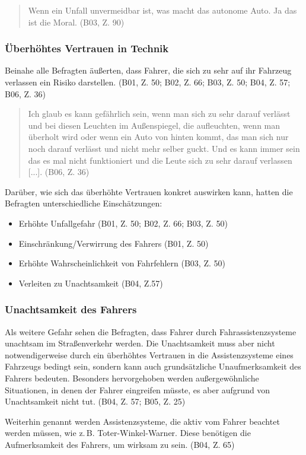 \documentclass[12pt]{article}
\begin{document}
\begin{quote}
  Wenn ein Unfall unvermeidbar ist, was macht das autonome Auto. Ja das ist die Moral. (B03, Z. 90)
\end{quote}

\subsubsection*{Überhöhtes Vertrauen in Technik}
Beinahe alle Befragten äußerten, dass Fahrer, die sich zu sehr auf ihr Fahrzeug verlassen ein Risiko darstellen. (B01, Z. 50; B02, Z. 66; B03, Z. 50; B04, Z. 57; B06, Z. 36)

\begin{quote}
  Ich glaub es kann gefährlich sein, wenn man sich zu sehr darauf verlässt und bei diesen Leuchten im Außenspiegel, die aufleuchten, wenn man überholt wird oder wenn ein Auto von hinten kommt, das man sich nur noch darauf verlässt und nicht mehr selber guckt. Und es kann immer sein das es mal nicht funktioniert und die Leute sich zu sehr darauf verlassen [...]. (B06, Z. 36)
\end{quote}

Darüber, wie sich das überhöhte Vertrauen konkret auswirken kann, hatten die Befragten unterschiedliche Einschätzungen:
\begin{itemize}
  \item Erhöhte Unfallgefahr (B01, Z. 50; B02, Z. 66; B03, Z. 50)
  \item Einschränkung/Verwirrung des Fahrers (B01, Z. 50)
  \item Erhöhte Wahrscheinlichkeit von Fahrfehlern (B03, Z. 50)
  \item Verleiten zu Unachtsamkeit (B04, Z.57)
\end{itemize}

\subsubsection*{Unachtsamkeit des Fahrers}
Als weitere Gefahr sehen die Befragten, dass Fahrer durch Fahrassistenzsysteme unachtsam im Straßenverkehr werden. Die Unachtsamkeit muss aber nicht notwendigerweise durch ein überhöhtes Vertrauen in die Assistenzsysteme eines Fahrzeugs bedingt sein, sondern kann auch grundsätzliche Unaufmerksamkeit des Fahrers bedeuten. Besonders hervorgehoben werden außergewöhnliche Situationen, in denen der Fahrer eingreifen müsste, es aber aufgrund von Unachtsamkeit nicht tut. (B04, Z. 57; B05, Z. 25)

Weiterhin genannt werden Assistenzsysteme, die aktiv vom Fahrer beachtet werden müssen, wie z.\,B. Toter-Winkel-Warner. Diese benötigen die Aufmerksamkeit des Fahrers, um wirksam zu sein. (B04, Z. 65)
\end{document}
